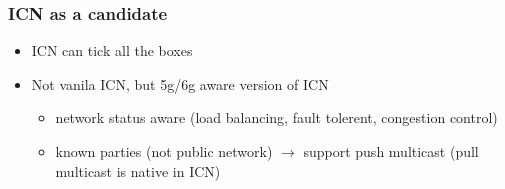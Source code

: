 \documentclass{beamer}
\begin{document}
\begin{frame}
  \frametitle{ICN as a candidate}
  \begin{itemize}
    \item {ICN can tick all the boxes}
    \item {Not vanila ICN, but 5g/6g aware version of ICN \begin{itemize}
      \item network status aware (load balancing, fault tolerent, congestion control)
      \item known parties (not public network) $\rightarrow$ support push multicast (pull multicast is native in ICN)
    \end{itemize}
    }
  \end{itemize}
\end{frame}
\end{document}
